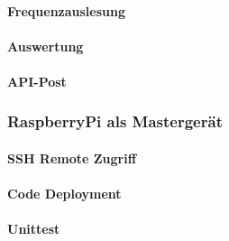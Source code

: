 \paragraph{Frequenzauslesung}

\paragraph{Auswertung}
\paragraph{API-Post}

\subsubsection{RaspberryPi als Mastergerät}
\paragraph{SSH Remote Zugriff}
\paragraph{Code Deployment}
\paragraph{Unittest}

\pagebreak


